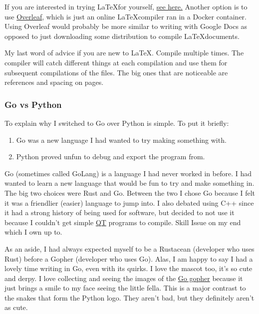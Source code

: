 If you are interested in trying \LaTeX for yourself,
\href{https://www.latex-project.org/get/}{see here.}
Another option is to use \href{}{Overleaf}, which is just an online
\LaTeX compiler ran in a Docker container.
Using Overleaf would probably be more similar to writing with Google
Docs as opposed to just downloading some distribution to compile
\LaTeX documents.

My last word of advice if you are new to \LaTeX. Compile multiple times.
The compiler will catch different things at each compilation and use
them for subsequent compilations of the files. The big ones that are
noticeable are references and spacing on pages.

\subsubsection{Go vs Python}

To explain why I switched to Go over Python is simple.
To put it briefly:
\begin{enumerate}
	\item Go was a new language I had wanted to try making something with.
	\item Python proved unfun to debug and export the program from.
\end{enumerate}

Go (sometimes called GoLang) is a language I had never worked in
before. I had wanted to
learn a new language that would be fun to try and make something
in. The big two choices were Rust and Go. Between the two I chose Go because
I felt it was a friendlier (easier) language to jump into. I also
debated using C++ since it had a strong history of being used for
software, but decided to not use it because I couldn't
get simple \href{https://www.qt.io/product/framework}{QT}
programs to compile. Skill Issue on my end which I own up to.

As an aside, I had always expected myself to be a Rustacean
(developer who uses Rust) before a
Gopher (developer who uses Go). Alas, I am happy to say I had a
lovely time writing in Go,
even with its quirks. I love the mascot too, it's so cute and derpy.
I love collecting and seeing the images of the
\href{https://go.dev/blog/gopher}{Go gopher}
because it just brings a smile to my face seeing the little fella.
This is a major contrast to the snakes that form the Python logo.
They aren't bad, but they definitely aren't as cute.

